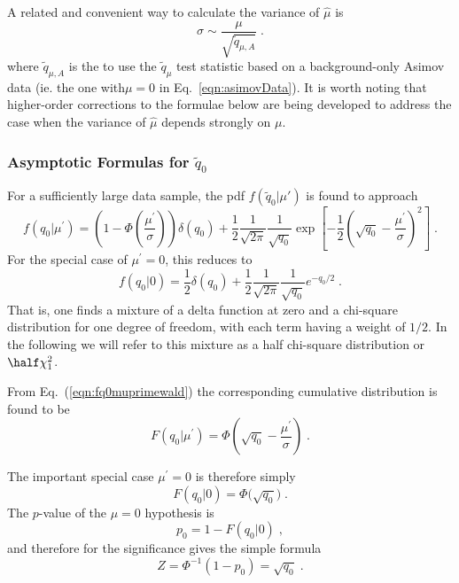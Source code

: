A related and convenient way to calculate the variance of $\hat\mu$ is 
\begin{equation}
\label{eqn:sigmaofmu}
\sigma \sim \frac{\mu}{\sqrt {\tilde q_{\mu,A}}} \;.
\end{equation}
where $\tilde q_{\mu,A}$ is the to use the $\tilde q_\mu$ test statistic based on a background-only Asimov data (ie. the one with$\mu=0$ in Eq.~\ref{eqn:asimovData}).  It is worth noting that higher-order corrections to the formulae below are being developed to address the case when the variance of $\hat\mu$ depends strongly on $\mu$.


\subsubsection{Asymptotic Formulas for $\tilde q_{0}$}
For a sufficiently large data sample,  the pdf $f(\tilde{q}_{0} | \mu')$ is found to approach
\begin{equation}
\label{eqn:fq0muprimewald}
f(q_0 | \mu^{\prime}) = \left( 1 - 
\Phi \left( \frac{ \mu^{\prime}}{\sigma} \right) \right) \delta(q_0)  + 
\frac{1}{2}
\frac{1}{\sqrt{2 \pi}} \frac{1}{\sqrt{q_0}} \exp 
\left[ - \frac{1}{2} \left( \sqrt{q_0} - \frac{\mu^{\prime}}{\sigma} 
\right)^2 \right] 
\;.
\end{equation}
For the special case of $\mu^{\prime} = 0$, this reduces to
\begin{equation}
\label{eqn:fq00}
f(q_0 | 0) = \frac{1}{2} \delta(q_0) + 
\frac{1}{2} \frac{1}{\sqrt{2 \pi}} \frac{1}{\sqrt{q_0}} e^{-q_0/2} \;.
\end{equation}
That is, one finds a mixture of a delta function at zero and
a chi-square distribution for one degree of freedom, with each term
having a weight of $1/2$.  In the following we will refer to this
mixture as a half chi-square distribution or $\half \chi^2_1$.


From Eq.~(\ref{eqn:fq0muprimewald}) the corresponding cumulative
distribution is found to be
\begin{equation}
\label{cdfq0muprimewald}
F(q_0 | \mu^{\prime}) = \Phi \left( \sqrt{q_0} - \frac{\mu^{\prime}}{\sigma} 
\right) \;.
\end{equation}


The important special case $\mu^{\prime} = 0$ is therefore simply
\begin{equation}
\label{cdfq00wald}
F(q_0 | 0) = \Phi \Big( \sqrt{q_0} \Big)
\;.
\end{equation}
The $p$-value of the $\mu=0$ hypothesis is 
\begin{equation}
\label{eqn:pval0}
p_0 = 1 - F(q_0 | 0) \;, 
\end{equation}
and therefore for the significance gives the simple formula
\begin{equation}
\label{eqn:Z0}
Z = \Phi^{-1}(1 - p_0) = \sqrt{q_0} \;.
\end{equation}


